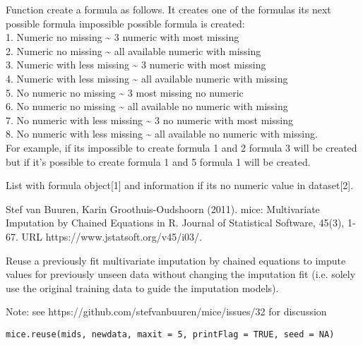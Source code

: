 \documentclass[letterpaper]{book}
\begin{document}
\begin{Details}\relax
Function create a formula as follows. It creates one of the formulas its next possible formula impossible possible formula is created: \\{} 1. Numeric no missing \textasciitilde{} 3 numeric with most missing \\{} 2. Numeric no missing \textasciitilde{} all available numeric with missing \\{} 3. Numeric with less missing \textasciitilde{} 3 numeric with most missing \\{} 4. Numeric with less missing \textasciitilde{} all available numeric with missing \\{} 5. No numeric no missing \textasciitilde{} 3 most missing no numeric \\{} 6. No numeric no missing \textasciitilde{} all available no numeric with missing \\{} 7. No numeric with less missing \textasciitilde{} 3 no numeric with most missing \\{} 8. No numeric with less missing \textasciitilde{} all available no numeric with missing.
\\{} For example, if its impossible to create formula 1 and 2 formula 3 will be created but if it's possible to create formula 1 and 5 formula 1 will be created.
\end{Details}
%
\begin{Value}
List with formula object[1] and information if its no numeric value in dataset[2].
\end{Value}
%
\begin{References}\relax
Stef van Buuren, Karin Groothuis-Oudshoorn (2011). mice: Multivariate Imputation by Chained Equations in R. Journal of Statistical Software, 45(3), 1-67. URL https://www.jstatsoft.org/v45/i03/.
\end{References}
%
\begin{Description}\relax
Reuse a previously fit multivariate imputation by chained equations to
impute values for previously unseen data without changing the imputation
fit (i.e. solely use the original training data to guide the imputation
models).

Note: see https://github.com/stefvanbuuren/mice/issues/32 for discussion
\end{Description}
%
\begin{Usage}
\begin{verbatim}
mice.reuse(mids, newdata, maxit = 5, printFlag = TRUE, seed = NA)
\end{verbatim}
\end{Usage}
\end{document}
